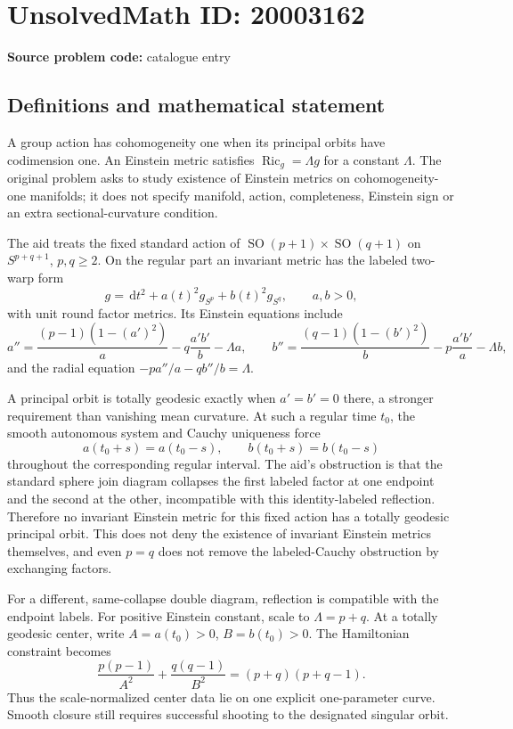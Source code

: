 \documentclass[11pt]{article}
\newcommand{\dd}{\,\mathrm{d}}
\begin{document}
\section*{UnsolvedMath ID: 20003162}
\textbf{Source problem code:} catalogue entry
\subsection{Definitions and mathematical statement}
A group action has cohomogeneity one when its principal orbits have codimension one. An Einstein metric satisfies $\operatorname{Ric}_g=\Lambda g$ for a constant $\Lambda$. The original problem asks to study existence of Einstein metrics on cohomogeneity-one manifolds; it does not specify manifold, action, completeness, Einstein sign or an extra sectional-curvature condition.

The aid treats the fixed standard action of $\operatorname{SO}(p+1)\times\operatorname{SO}(q+1)$ on $S^{p+q+1}$, $p,q\geq2$. On the regular part an invariant metric has the labeled two-warp form
\[
g=\dd t^2+a(t)^2g_{S^p}+b(t)^2g_{S^q},\qquad a,b>0,
\]
with unit round factor metrics. Its Einstein equations include
\[
a''=\frac{(p-1)(1-(a')^2)}a-q\frac{a'b'}b-\Lambda a,
\qquad
b''=\frac{(q-1)(1-(b')^2)}b-p\frac{a'b'}a-\Lambda b,
\]
and the radial equation $-pa''/a-qb''/b=\Lambda$.

A principal orbit is totally geodesic exactly when $a'=b'=0$ there, a stronger requirement than vanishing mean curvature. At such a regular time $t_0$, the smooth autonomous system and Cauchy uniqueness force
\[
a(t_0+s)=a(t_0-s),\qquad b(t_0+s)=b(t_0-s)
\]
throughout the corresponding regular interval. The aid's obstruction is that the standard sphere join diagram collapses the first labeled factor at one endpoint and the second at the other, incompatible with this identity-labeled reflection. Therefore no invariant Einstein metric for this fixed action has a totally geodesic principal orbit. This does not deny the existence of invariant Einstein metrics themselves, and even $p=q$ does not remove the labeled-Cauchy obstruction by exchanging factors.

For a different, same-collapse double diagram, reflection is compatible with the endpoint labels. For positive Einstein constant, scale to $\Lambda=p+q$. At a totally geodesic center, write $A=a(t_0)>0$, $B=b(t_0)>0$. The Hamiltonian constraint becomes
\[
\frac{p(p-1)}{A^2}+\frac{q(q-1)}{B^2}
=(p+q)(p+q-1).
\]
Thus the scale-normalized center data lie on one explicit one-parameter curve. Smooth closure still requires successful shooting to the designated singular orbit.
\end{document}

